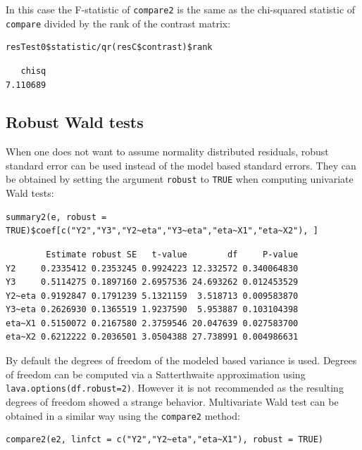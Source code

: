 \documentclass[12pt]{article}
\begin{document}
In this case the F-statistic of \texttt{compare2} is the same as the
chi-squared statistic of \texttt{compare} divided by the rank of the contrast matrix:
\lstset{language=r,label= ,caption= ,captionpos=b,numbers=none}
\begin{lstlisting}
resTest0$statistic/qr(resC$contrast)$rank
\end{lstlisting}

\begin{verbatim}
   chisq 
7.110689
\end{verbatim}

\subsection{Robust Wald tests}
\label{sec:orga215f3d}

When one does not want to assume normality distributed residuals,
robust standard error can be used instead of the model based standard
errors. They can be obtained by setting the argument \texttt{robust} to \texttt{TRUE}
when computing univariate Wald tests:
\lstset{language=r,label= ,caption= ,captionpos=b,numbers=none}
\begin{lstlisting}
summary2(e, robust = TRUE)$coef[c("Y2","Y3","Y2~eta","Y3~eta","eta~X1","eta~X2"), ]
\end{lstlisting}

\begin{verbatim}
        Estimate robust SE   t-value        df     P-value
Y2     0.2335412 0.2353245 0.9924223 12.332572 0.340064830
Y3     0.5114275 0.1897160 2.6957536 24.693262 0.012453529
Y2~eta 0.9192847 0.1791239 5.1321159  3.518713 0.009583870
Y3~eta 0.2626930 0.1365519 1.9237590  5.953887 0.103104398
eta~X1 0.5150072 0.2167580 2.3759546 20.047639 0.027583700
eta~X2 0.6212222 0.2036501 3.0504388 27.738991 0.004986631
\end{verbatim}


By default the degrees of freedom of the modeled based variance is
used. Degrees of freedom can be computed via a Satterthwaite
approximation using \texttt{lava.options(df.robust=2)}. However it is not
recommended as the resulting degrees of freedom showed a strange
behavior. Multivariate Wald test can be obtained in a similar way
using the \texttt{compare2} method:
\lstset{language=r,label= ,caption= ,captionpos=b,numbers=none}
\begin{lstlisting}
compare2(e2, linfct = c("Y2","Y2~eta","eta~X1"), robust = TRUE)
\end{lstlisting}
\end{document}
